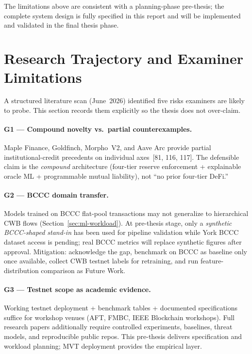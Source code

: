 \documentclass[12pt,a4paper]{report}
\begin{document}
The limitations above are consistent with a planning-phase pre-thesis; the complete system design is fully specified in this report and will be implemented and validated in the final thesis phase.

\section{Research Trajectory and Examiner Limitations}
\label{sec:research-limitations}

A structured literature scan (June~2026) identified five risks examiners are likely to probe. This section records them explicitly so the thesis does not over-claim.

\paragraph{G1 --- Compound novelty vs.\ partial counterexamples.}
Maple Finance, Goldfinch, Morpho~V2, and Aave Arc provide partial institutional-credit precedents on individual axes~[81, 116, 117]. The defensible claim is the \textit{compound} architecture (four-tier reserve enforcement + explainable oracle ML + programmable mutual liability), not ``no prior four-tier DeFi.''

\paragraph{G2 --- BCCC domain transfer.}
Models trained on BCCC flat-pool transactions may not generalize to hierarchical CWB flows (Section~\ref{sec:ml-workload}). At pre-thesis stage, only a \textit{synthetic BCCC-shaped stand-in} has been used for pipeline validation while York BCCC dataset access is pending; real BCCC metrics will replace synthetic figures after approval. Mitigation: acknowledge the gap, benchmark on BCCC as baseline only once available, collect CWB testnet labels for retraining, and run feature-distribution comparison as Future Work.

\paragraph{G3 --- Testnet scope as academic evidence.}
Working testnet deployment + benchmark tables + documented specifications suffice for workshop venues (AFT, FMBC, IEEE Blockchain workshops). Full research papers additionally require controlled experiments, baselines, threat models, and reproducible public repos. This pre-thesis delivers specification and workload planning; MVT deployment provides the empirical layer.
\end{document}

